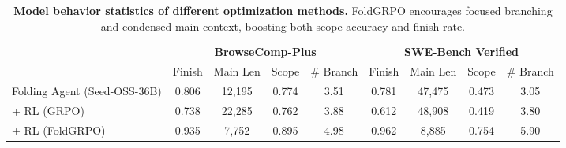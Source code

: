 \begin{table}[t!]
\centering\small
\setlength{\tabcolsep}{3pt}
\begin{tabular}{l|cccc|cccc}
\toprule
& \multicolumn{4}{c|}{\textbf{BrowseComp-Plus}} & \multicolumn{4}{c}{\textbf{SWE-Bench Verified}} \\
 & Finish & Main Len & Scope & \# Branch & Finish & Main Len & Scope & \# Branch \\
 
\midrule
Folding Agent (Seed-OSS-36B) & 0.806 & 12,195 & 0.774 & 3.51 & 0.781 & 47,475 & 0.473  & 3.05\\
\quad + RL (GRPO) & 0.738 & 22,285 & 0.762 & 3.88 & 0.612 & 48,908 & 0.419 & 3.80\\
\quad + RL (FoldGRPO) & 0.935 & 7,752 & 0.895 & 4.98 & 0.962 & 8,885 & 0.754 & 5.90\\
\bottomrule

\end{tabular}
\vspace{-0.5em}
\caption{\textbf{Model behavior statistics of different optimization methods.} FoldGRPO encourages focused branching and condensed main context, boosting both scope accuracy and finish rate.}\label{tab:action}
\end{table}